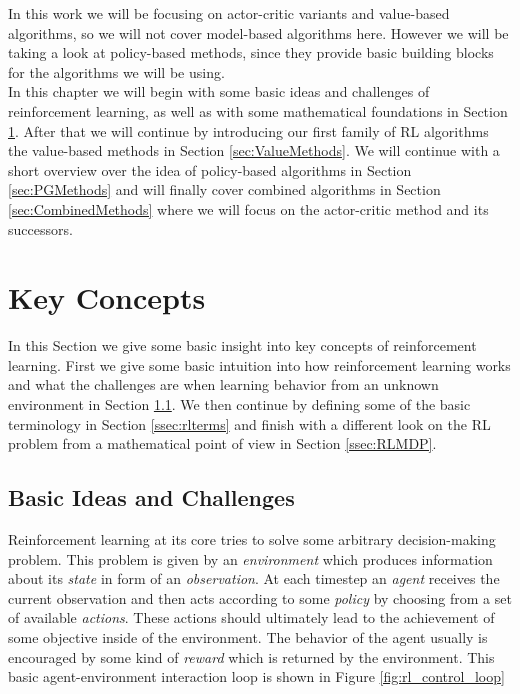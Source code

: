 In this work we will be focusing on actor-critic variants and value-based algorithms, so we will not cover model-based algorithms here. However we will be taking a look at policy-based methods, since they provide basic building blocks for the algorithms we will be using. \\ 
In this chapter we will begin with some basic ideas and challenges of reinforcement learning, as well as with some mathematical foundations in Section \ref{sec:concepts}. After that we will continue by introducing our first family of RL algorithms the value-based methods in Section \ref{sec:ValueMethods}. We will continue with a short overview over the idea of policy-based algorithms in Section \ref{sec:PGMethods} and will finally cover combined algorithms in Section \ref{sec:CombinedMethods} where we will focus on the actor-critic method and its successors.

\section{Key Concepts} \label{sec:concepts}
In this Section we give some basic insight into key concepts of reinforcement learning. First we give some basic intuition into how reinforcement learning works and what the challenges are when learning behavior from an unknown environment in Section \ref{ssec:rlidea}. We then continue by defining some of the basic terminology in Section \ref{ssec:rlterms} and finish with a different look on the RL problem from a mathematical point of view in Section \ref{ssec:RLMDP}.  

\subsection{Basic Ideas and Challenges} \label{ssec:rlidea}

Reinforcement learning at its core tries to solve some arbitrary decision-making problem. This problem is given by an \textit{environment} which produces information about its \textit{state} in form of an \textit{observation}. At each timestep an \textit{agent} receives the current observation and then acts according to some \textit{policy} by choosing from a set of available \textit{actions}. These actions should ultimately lead to the achievement of some objective inside of the environment. The behavior of the agent usually is encouraged by some kind of \textit{reward} which is returned by the environment. This basic agent-environment interaction loop is shown in Figure \ref{fig:rl_control_loop} \\ 

